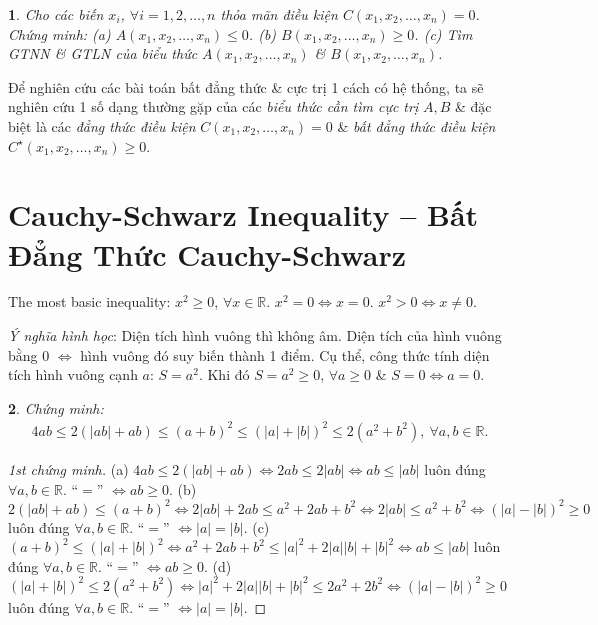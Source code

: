 \documentclass{article}
\newtheorem{baitoan}{}
\begin{document}
\begin{baitoan}
	Cho các biến $x_i$, $\forall i = 1,2,\ldots,n$ thỏa mãn điều kiện $C(x_1,x_2,\ldots,x_n) = 0$. Chứng minh: (a) $A(x_1,x_2,\ldots,x_n)\le0$. (b) $B(x_1,x_2,\ldots,x_n)\ge0$. (c) Tìm {\rm GTNN} \& {\rm GTLN} của biểu thức $A(x_1,x_2,\ldots,x_n)$ \& $B(x_1,x_2,\ldots,x_n)$.
\end{baitoan}
Để nghiên cứu các bài toán bất đẳng thức \& cực trị 1 cách có hệ thống, ta sẽ nghiên cứu 1 số dạng thường gặp của các \textit{biểu thức cần tìm cực trị} $A,B$ \& đặc biệt là các \textit{đẳng thức điều kiện} $C(x_1,x_2,\ldots,x_n) = 0$ \& \textit{bất đẳng thức điều kiện} $C^\star(x_1,x_2,\ldots,x_n)\ge0$.


\section{Cauchy-Schwarz Inequality -- Bất Đẳng Thức Cauchy-Schwarz}
The most basic inequality: $x^2\ge0$, $\forall x\in\mathbb{R}$. $x^2 = 0\Leftrightarrow x = 0$. $x^2 > 0\Leftrightarrow x\ne0$.

\textit{Ý nghĩa hình học}: Diện tích hình vuông thì không âm. Diện tích của hình vuông bằng 0 $\Leftrightarrow$ hình vuông đó suy biến thành 1 điểm. Cụ thể, công thức tính diện tích hình vuông cạnh $a$: $S = a^2$. Khi đó $S = a^2\ge0$, $\forall a\ge0$ \& $S = 0\Leftrightarrow a = 0$.

\begin{baitoan}
	Chứng minh:
	\begin{align}
		\label{1}
		4ab\le2(|ab| + ab)\le(a + b)^2\le(|a| + |b|)^2\le2(a^2 + b^2),\ \forall a,b\in\mathbb{R}.
	\end{align}
\end{baitoan}

\begin{proof}[1st chứng minh]
	(a) $4ab\le2(|ab| + ab)\Leftrightarrow2ab\le2|ab|\Leftrightarrow ab\le|ab|$ luôn đúng $\forall a,b\in\mathbb{R}$. ``$=$'' $\Leftrightarrow ab\ge0$. (b) $2(|ab| + ab)\le(a + b)^2\Leftrightarrow2|ab| + 2ab\le a^2 + 2ab + b^2\Leftrightarrow2|ab|\le a^2 + b^2\Leftrightarrow(|a| - |b|)^2\ge0$ luôn đúng $\forall a,b\in\mathbb{R}$. ``$=$'' $\Leftrightarrow|a| = |b|$. (c) $(a + b)^2\le(|a| + |b|)^2\Leftrightarrow a^2 + 2ab + b^2\le|a|^2 + 2|a||b| + |b|^2\Leftrightarrow ab\le|ab|$ luôn đúng $\forall a,b\in\mathbb{R}$. ``$=$'' $\Leftrightarrow ab\ge0$. (d) $(|a| + |b|)^2\le2(a^2 + b^2)\Leftrightarrow|a|^2 + 2|a||b| + |b|^2\le2a^2 + 2b^2\Leftrightarrow(|a| - |b|)^2\ge0$ luôn đúng $\forall a,b\in\mathbb{R}$. ``$=$'' $\Leftrightarrow|a| = |b|$.
\end{proof}
\end{document}
